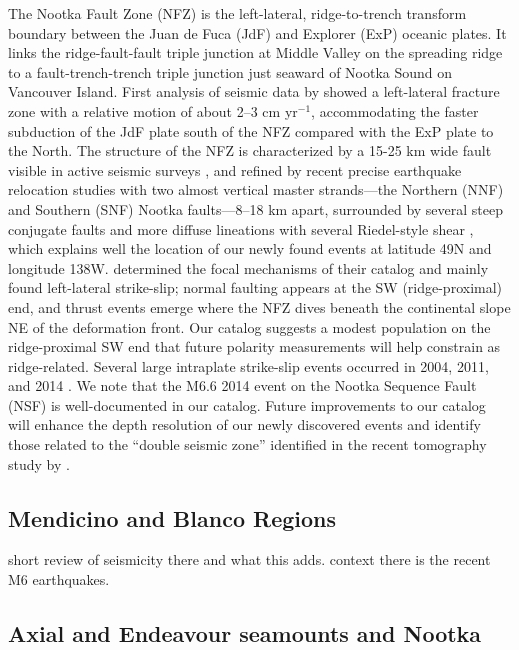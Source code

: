 \documentclass[review]{seismica}
\begin{document}
The Nootka Fault Zone (NFZ) is the left-lateral, ridge-to-trench
transform boundary between the Juan de Fuca (JdF) and Explorer (ExP)
oceanic plates. It links the ridge-fault-fault triple junction at Middle
Valley on the spreading ridge to a fault-trench-trench triple junction
just seaward of Nootka Sound on Vancouver Island. First analysis of
seismic data by \citet{Hyndman79} showed a left-lateral fracture zone
with a relative motion of about 2--3 cm yr\(^{-1}\), accommodating the
faster subduction of the JdF plate south of the NFZ compared with the
ExP plate to the North. The structure of the NFZ is characterized by a
15-25 km wide fault visible in active seismic surveys \citep{Hyndman79},
and refined by recent precise earthquake relocation studies with two
almost vertical master strands---the Northern (NNF) and Southern (SNF)
Nootka faults---8--18 km apart, surrounded by several steep conjugate
faults and more diffuse lineations with several Riedel-style shear
\citep{Hutchinson19, hutchinson2023tectonic}, which explains well the
location of our newly found events at latitude 49N and longitude 138W.
\citet{Hutchinson19} determined the focal mechanisms of their catalog
and mainly found left-lateral strike-slip; normal faulting appears at
the SW (ridge-proximal) end, and thrust events emerge where the NFZ
dives beneath the continental slope NE of the deformation front. Our
catalog suggests a modest population on the ridge-proximal SW end that
future polarity measurements will help constrain as ridge-related.
Several large intraplate strike-slip events occurred in 2004, 2011, and
2014 \citep{Merrill22}. We note that the M6.6 2014 event on the Nootka
Sequence Fault (NSF) is well-documented in our catalog. Future
improvements to our catalog will enhance the depth resolution of our
newly discovered events and identify those related to the ``double
seismic zone'' identified in the recent tomography study by
\citet{Merrill22}.

\subsection{Mendicino and Blanco
Regions}\label{mendicino-and-blanco-regions}

short review of seismicity there and what this adds. context there is
the recent M6 earthquakes.

\subsection{Axial and Endeavour seamounts and
Nootka}\label{axial-and-endeavour-seamounts-and-nootka}
\end{document}

